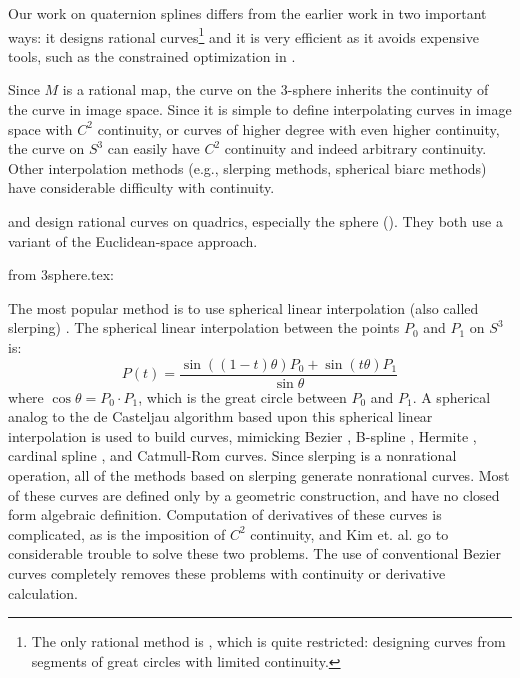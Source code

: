 Our work on quaternion splines differs from the earlier work
in two important ways: it designs rational curves\footnote{The
	only rational method is \cite{wang93}, which is quite restricted:
	designing curves from segments of great circles
	with limited continuity.}
and it is very efficient as it avoids expensive tools,
such as the constrained optimization in \cite{barr92}.

Since $M$ is a rational map,
the curve on the 3-sphere inherits the continuity of the curve in image space.
Since it is simple to define interpolating curves
in image space with $C^2$ continuity, or curves of higher degree with
even higher continuity, 
the curve on $S^3$ can easily have $C^2$ continuity
and indeed arbitrary continuity.
Other interpolation methods (e.g., slerping methods, spherical biarc methods)
have considerable difficulty with continuity.

\cite{dietz93} and \cite{wang94} design rational curves on quadrics,
especially the sphere ().
They both use a variant of the Euclidean-space approach.

\cite{park95}

from 3sphere.tex:

The most popular method is to use spherical linear interpolation 
(also called slerping) 
\cite{shoemake85,duff85,pletinckx89,schlag91,nielson92,nielson93,kim95,nam95}.
The spherical linear interpolation between the points $P_0$ and $P_1$ on $S^3$ is:
\[ P(t) = \frac{\sin((1-t)\theta) P_0 + \sin(t \theta) P_1}{\sin \theta}
\]
where $\cos \theta = P_0 \cdot P_1$, which is the great circle between $P_0$ and $P_1$.
A spherical analog to the de Casteljau algorithm based upon this
spherical linear interpolation is used to build curves,
mimicking Bezier \cite{shoemake85,kim95}, B-spline 
\cite{duff85,nielson92,nielson93,kim95}, Hermite \cite{kim95,nam95},
cardinal spline \cite{pletinckx89}, and Catmull-Rom \cite{schlag91} curves.
Since slerping is a nonrational operation,
all of the methods based on slerping generate nonrational curves.
Most of these curves are defined only by a geometric construction, and have
no closed form algebraic definition.
Computation of derivatives of these curves is complicated,
as is the imposition of $C^2$ continuity, and
Kim et. al. \cite{kim95} go to considerable trouble to solve these two problems.
The use of conventional Bezier curves completely removes 
these problems with continuity or derivative calculation.

